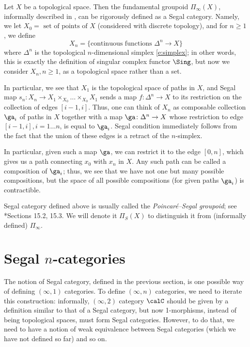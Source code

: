 \begin{example}\label{x:poincare-segal}
  Let $X$ be a topological space. Then the fundamental groupoid
  $\Pi_{\infty}(X)$, informally described in ,
  can be rigorously defined as a Segal category. Namely, we let
  $X_0=\text{ set of points of $X$}$ (considered with discrete topology),
  and for $n\ge 1$, we define
  $$
    X_n= \{\text{continuous functions $\Delta^n\to X$}\}
  $$
  where $\Delta^n$ is the topological $n$-dimensional simplex \eqref{e:simplex};
  in other words, this is exactly the definition of singular complex functor
  $\Sing$, but now we consider $X_n, n\ge 1$, as a topological space rather
  than a set.

  In particular, we see that $X_1$ is the topological space of paths in $X$, and
  Segal map $s_n\colon X_n \to X_1\times_{X_0}\dots\times_{X_0} X_1$ sends a map
  $f\colon \Delta^n\to X$ to its restriction on the collection of edges $[i-1,
  i]$. Thus, one can think of $X_n$ as composable collection $\ga_i$ of paths in
  $X$ together with a map $\ga \colon \Delta^n\to X$ whose restriction to edge
  $[i-1, i], i=1\dots n$, is equal to $\ga_i$. Segal condition immediately
  follows from the fact that the union of these edges is a retract of the
  $n$-simplex.

  In particular, given such a map $\ga$, we can restrict it to the edge $[0,n]$,
  which gives us a path connecting $x_0$ with $x_n$ in $X$. Any such path can be
  called a composition of $\ga_i$; thus, we see that we have not one but many
  possible compositions, but the space of all possible compositions (for given
  paths $\ga_i$) is contractible.

  Segal category defined above is usually called the \emph{Poincar\'e--Segal
  groupoid}; see *{Sections 15.2, 15.3}. We will denote it
  $\Pi_S(X)$ to distinguish it from (informally defined) $\Pi_{\infty}$.

\end{example}

\section{Segal $n$-categories}\label{s:segal-ncat}

The notion of Segal category, defined in the previous section, is one possible
way of defining $(\infty, 1)$ categories. To define $(\infty,n)$ categories, we
need to iterate this construction: informally, $(\infty, 2)$ category $\calC$
should be given by a definition similar to that of a Segal category, but now
1-morphisms, instead of being topological spaces, must form Segal categories.
However, to do that, we need to have a notion of weak equivalence between Segal
categories (which we have not defined so far) and so on.


